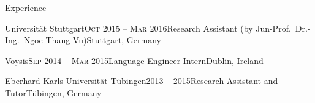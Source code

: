 \documentclass{resume} %
\begin{document}
\begin{rSection}{Experience}

\begin{rSubsection}{Universität Stuttgart}{\textsc{Oct} 2015 -- \textsc{Mar} 2016}{Research Assistant (by Jun-Prof.\ Dr.-Ing.\ Ngoc Thang Vu)}{Stuttgart, Germany}
	\setlength{\itemindent}{.7cm}
	
	\item[]%
	
	\item[]%
\end{rSubsection}

\begin{rSubsection}{Voysis}{\textsc{Sep} 2014 -- \textsc{Mar} 2015}{Language Engineer Intern}{Dublin, Ireland}
	\setlength{\itemindent}{.7cm}
	
	\item[]%
	
	\item[]%
\end{rSubsection}

\begin{rSubsection}{Eberhard Karls Universität Tübingen}{2013 -- 2015}{Research Assistant and Tutor}{Tübingen, Germany}
	\setlength{\itemindent}{.7cm}
	
	\item[]%
	
	\item[]%
\end{rSubsection}

%	
%	


\end{rSection}
\end{document}
